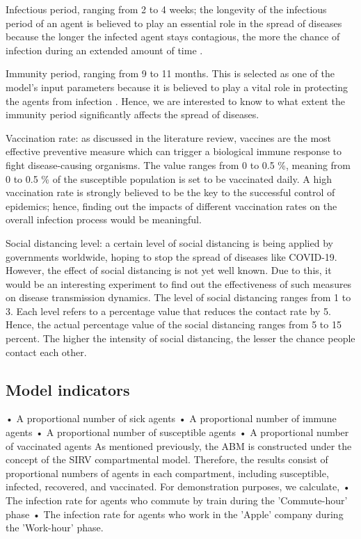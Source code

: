 \documentclass[smallextended]{svjour3}       %
\begin{document}
\begin{itemise}
	\item Infectious period, ranging from 2 to 4 weeks; the longevity of the infectious period of an agent is believed to play an essential role in the spread of diseases because the longer the infected agent stays contagious, the more the chance of infection during an extended amount of time \cite{wilkinson2018impact}.
	\item Immunity period, ranging from 9 to 11 months. This is selected as one of the model’s input parameters because it is believed to play a vital role in protecting the agents from infection \cite{reyes2016modeling}. Hence, we are interested to know to what extent the immunity period significantly affects the spread of diseases.
	\item Vaccination rate: as discussed in the literature review, vaccines are the most effective preventive measure which can trigger a biological immune response to fight disease-causing organisms. The value ranges from 0 to 0.5 \%, meaning from 0 to 0.5 \% of the susceptible population is set to be vaccinated daily. A high vaccination rate is strongly believed to be the key to the successful control of epidemics; hence, finding out the impacts of different vaccination rates on the overall infection process would be meaningful.
	\item Social distancing level: a certain level of social distancing is being applied by governments worldwide, hoping to stop the spread of diseases like COVID-19. However, the effect of social distancing is not yet well known. Due to this, it would be an interesting experiment to find out the effectiveness of such measures on disease transmission dynamics. The level of social distancing ranges from 1 to 3. Each level refers to a percentage value that reduces the contact rate by 5. Hence, the actual percentage value of the social distancing ranges from 5 to 15 percent. The higher the intensity of social distancing, the lesser the chance people contact each other.
\end{itemise}



\subsection{Model indicators}


• A proportional number of sick agents
• A proportional number of immune agents
• A proportional number of susceptible agents
• A proportional number of vaccinated agents
As mentioned previously, the ABM is constructed under the concept of the SIRV compartmental model. Therefore, the results consist of proportional numbers of agents in each compartment, including susceptible, infected, recovered, and vaccinated.
For demonstration purposes, we calculate,
• The infection rate for agents who commute by train during the 'Commute-hour' phase
• The infection rate for agents who work in the 'Apple' company during the 'Work-hour'
phase.
\end{document}

